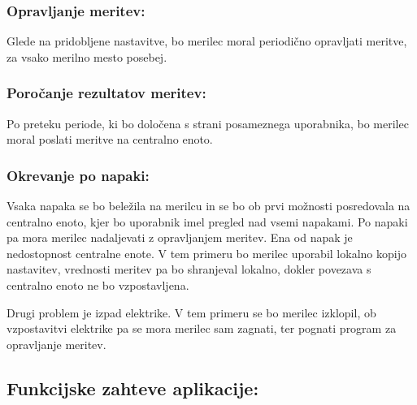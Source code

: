 \documentclass[12pt,a4paper,titlepage,openany]{report}
\begin{document}
\subsubsection{Opravljanje meritev:}
Glede na pridobljene nastavitve, bo merilec moral periodično opravljati meritve, za vsako merilno mesto posebej. 
\subsubsection{Poročanje rezultatov meritev:}
Po preteku periode, ki bo določena s strani posameznega uporabnika, bo merilec moral poslati meritve na centralno enoto. 
\subsubsection{Okrevanje po napaki:}
Vsaka napaka se bo beležila na merilcu  in se bo ob prvi možnosti posredovala na centralno enoto, kjer bo uporabnik imel pregled nad vsemi napakami. Po napaki pa mora merilec nadaljevati z opravljanjem meritev. Ena od napak je nedostopnost centralne enote. V tem primeru bo merilec uporabil lokalno kopijo nastavitev, vrednosti meritev pa bo shranjeval lokalno, dokler povezava s centralno enoto ne bo vzpostavljena. 

Drugi problem je izpad elektrike. V tem primeru se bo merilec izklopil, ob vzpostavitvi elektrike pa se mora merilec sam zagnati, ter pognati program za opravljanje meritev.


\subsection{Funkcijske zahteve aplikacije:}
\end{document}
